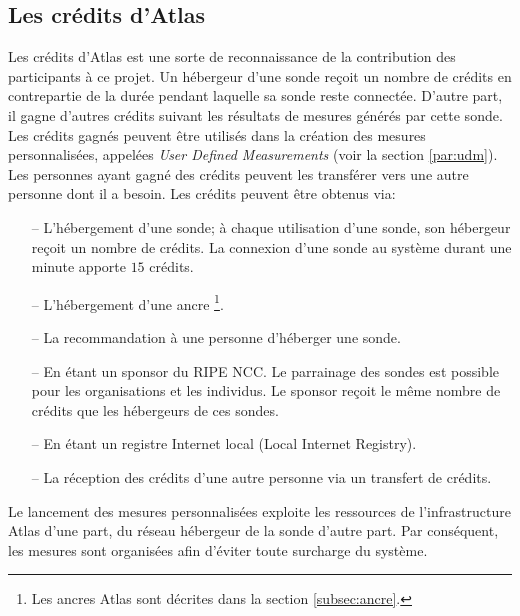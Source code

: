 \subsection{Les crédits d'Atlas} \label{credits-atlas}
Les crédits  d'Atlas est une sorte de reconnaissance de la contribution des participants à ce projet. Un hébergeur d'une sonde   reçoit un nombre de crédits en contrepartie de la durée pendant laquelle sa sonde reste connectée. D'autre part, il gagne d'autres crédits suivant les résultats de mesures générés par cette sonde. Les crédits gagnés peuvent être utilisés dans la création des mesures personnalisées, appelées  \textit{User Defined Measurements} (voir la section \ref{par:udm}). Les personnes ayant gagné des crédits peuvent les transférer vers une autre personne dont il a besoin. Les crédits peuvent être obtenus via:
\begin{itemize}
	\item[--] L'hébergement d'une sonde; à chaque utilisation d'une sonde, son hébergeur reçoit un nombre de crédits.  La connexion d'une sonde   au système durant une minute apporte $15$ crédits.
	\item[--] L'hébergement d'une ancre \footnote{Les ancres Atlas sont décrites dans  la section \ref{subsec:ancre}.}.
	\item[--] La recommandation à une personne d'héberger une sonde.
	\item[--] En étant un sponsor du RIPE NCC. Le parrainage des sondes est possible pour les organisations et les individus.  Le sponsor reçoit le même nombre de crédits que les hébergeurs de ces sondes.
	\item[--] En étant  un  registre Internet local (Local Internet Registry).
	\item[--] La réception des crédits d'une autre personne via un transfert de crédits.
\end{itemize}

Le lancement des mesures personnalisées exploite les ressources de l'infrastructure  Atlas d'une part,  du réseau hébergeur de la sonde d'autre part. Par conséquent, les mesures sont organisées afin d'éviter toute surcharge du système. 

